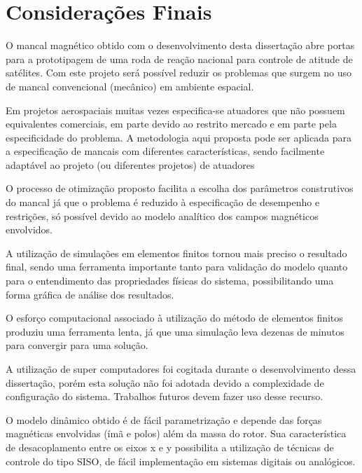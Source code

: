 \pagestyle{empty}
	\cleardoublepage
\pagestyle{fancy}

\chapter{Considerações Finais} \label{Cap:Consideracoes:Finais}

O mancal magnético obtido com o desenvolvimento desta dissertação abre portas para a prototipagem de uma roda de reação nacional para controle de atitude de satélites. Com este projeto será possível reduzir os problemas que surgem no uso de mancal convencional (mecânico) em ambiente espacial.

Em projetos aerospaciais muitas vezes especifica-se atuadores que não possuem equivalentes comerciais, em parte devido ao restrito mercado e em parte pela especificidade do problema. A metodologia aqui proposta pode ser aplicada para a especificação de mancais com diferentes características, sendo facilmente adaptável ao projeto (ou diferentes projetos) de atuadores


O processo de otimização proposto facilita a escolha dos parâmetros construtivos do mancal já que o problema é reduzido à especificação de desempenho e restrições, só possível devido ao modelo analítico dos campos magnéticos envolvidos.

A utilização de simulações em elementos finitos tornou mais preciso o resultado final, sendo uma ferramenta importante tanto para validação do modelo quanto para o entendimento das propriedades físicas do sistema, possibilitando uma forma gráfica de análise dos resultados. 

O esforço computacional associado à utilização do método de elementos finitos produziu uma ferramenta lenta, já que uma simulação leva dezenas de minutos para convergir para uma solução.

A utilização de super computadores foi cogitada durante o desenvolvimento dessa dissertação, porém esta solução não foi adotada devido a complexidade de configuração do sistema. Trabalhos futuros devem fazer uso desse recurso.

O modelo dinâmico obtido é de fácil parametrização e depende das forças magnéticas envolvidas (ímã e polos) além da massa do rotor. Sua característica de desacoplamento entre os eixos x e y possibilita a utilização de técnicas de controle do tipo SISO, de fácil implementação em sistemas digitais ou analógicos.

